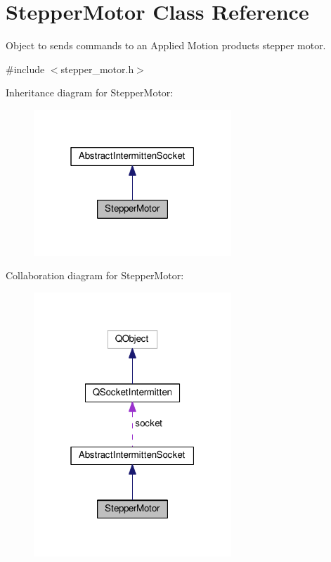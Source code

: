 \hypertarget{class_stepper_motor}{\section{Stepper\+Motor Class Reference}
\label{class_stepper_motor}
}


Object to sends commands to an Applied Motion products stepper motor.  




{\ttfamily \#include $<$stepper\+\_\+motor.\+h$>$}



Inheritance diagram for Stepper\+Motor\+:
\nopagebreak
\begin{figure}[H]
\begin{center}
\leavevmode
\includegraphics[width=211pt]{class_stepper_motor__inherit__graph}
\end{center}
\end{figure}


Collaboration diagram for Stepper\+Motor\+:
\nopagebreak
\begin{figure}[H]
\begin{center}
\leavevmode
\includegraphics[width=211pt]{class_stepper_motor__coll__graph}
\end{center}
\end{figure}
